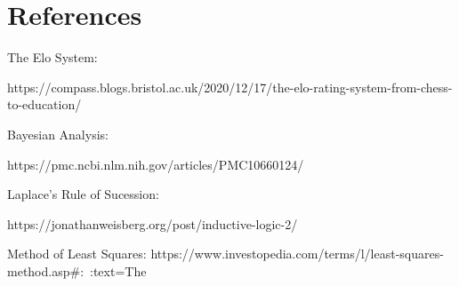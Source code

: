 \documentclass[12pt]{article}
\begin{document}
\newpage
\section*{References}
\begin{flushleft}
The Elo System:

https://compass.blogs.bristol.ac.uk/2020/12/17/the-elo-rating-system-from-chess-to-education/

Bayesian Analysis:

https://pmc.ncbi.nlm.nih.gov/articles/PMC10660124/

Laplace's Rule of Sucession:

https://jonathanweisberg.org/post/inductive-logic-2/

Method of Least Squares:
https://www.investopedia.com/terms/l/least-squares-method.asp#:~:text=The%
\end{flushleft}
\end{document}
